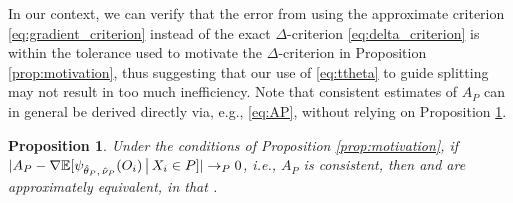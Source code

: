 \documentclass[aos]{imsart}
\theoremstyle{plain}
\newtheorem{prop}{Proposition}
\theoremstyle{definition}
\theoremstyle{remark}
\begin{document}
\begin{CJK}{UTF8}{gbsn}

In our context, we can verify that the error from using the approximate criterion \eqref{eq:gradient_criterion} instead of
the exact $\Delta$-criterion \eqref{eq:delta_criterion} is within the tolerance used
to motivate the $\Delta$-criterion in Proposition \ref{prop:motivation}, thus suggesting
that our use of \eqref{eq:ttheta} to guide splitting may not result in too much inefficiency.
Note that consistent estimates of $A_P$ can in general be derived directly via, e.g., \eqref{eq:AP},
without relying on Proposition \ref{prop:approximation}.

\begin{prop}
\label{prop:approximation}
Under the conditions of Proposition \ref{prop:motivation}, if 
$|A_P - \nabla \mathbb{E}[\psi_{\hat{\theta}_P, \, \hat{\nu}_P}(O_i) \,\big|\, X_i \in P]| \rightarrow_P 0$,
i.e., $A_P$ is consistent,
then  and  are approximately equivalent, in that
.
\end{prop}

\newcommand{\pluseq}{\mathrel{+}=}


\end{CJK}
\end{document}
